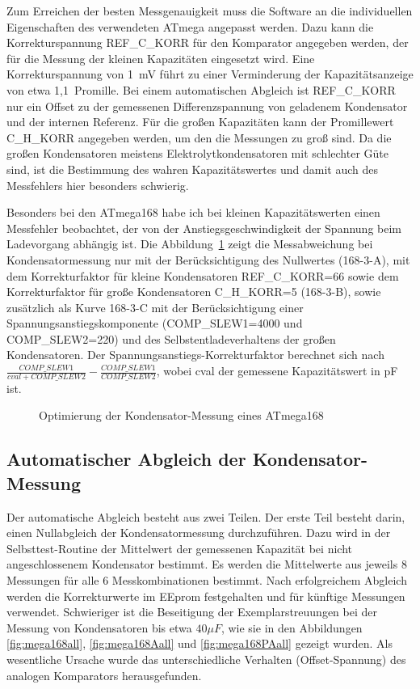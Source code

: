 Zum Erreichen der besten Messgenauigkeit muss die Software an die individuellen Eigenschaften des verwendeten ATmega
angepasst werden. Dazu kann die Korrekturspannung REF\_C\_KORR für den Komparator angegeben werden, der für die Messung der kleinen 
Kapazitäten eingesetzt wird. Eine Korrekturspannung von 1~mV führt zu einer Verminderung der Kapazitätsanzeige von etwa 1,1~Promille.
Bei einem automatischen Abgleich ist REF\_C\_KORR  nur ein Offset zu der gemessenen Differenzspannung von geladenem Kondensator
und der internen Referenz.
Für die großen Kapazitäten kann der Promillewert C\_H\_KORR angegeben werden, um den die Messungen
zu groß sind.
Da die großen Kondensatoren meistens Elektrolytkondensatoren mit schlechter Güte sind, ist die Bestimmung
des wahren Kapazitätswertes und damit auch des Messfehlers hier besonders schwierig.

Besonders bei den ATmega168 habe ich bei kleinen Kapazitätswerten einen Messfehler beobachtet, 
der von der Anstiegsgeschwindigkeit der Spannung beim Ladevorgang abhängig ist.
Die Abbildung~\ref{fig:mega168optcap} zeigt die Messabweichung bei Kondensatormessung nur mit der Berücksichtigung des
Nullwertes (168-3-A), mit dem Korrekturfaktor für kleine Kondensatoren REF\_C\_KORR=66 sowie dem Korrekturfaktor für große
Kondensatoren C\_H\_KORR=5 (168-3-B), sowie zusätzlich als Kurve 168-3-C  mit der Berücksichtigung einer Span\-nungs\-an\-stiegs\-kom\-po\-nen\-te 
(COMP\_SLEW1=4000 und COMP\_SLEW2=220) und des Selbst\-ent\-lade\-ver\-hal\-tens der großen Kon\-den\-sa\-toren.
Der Span\-nungs\-an\-stiegs-Kor\-rek\-tur\-faktor berechnet sich nach \(\frac{COMP\_SLEW1}{cval+COMP\_SLEW2} - \frac{COMP\_SLEW1}{COMP\_SLEW2}\),
wobei cval der gemessene Kapazitätswert in pF ist.

\begin{figure}[H]
\centering

\caption{Optimierung der Kondensator-Messung eines ATmega168}
\label{fig:mega168optcap}
\end{figure}

\subsection{Automatischer Abgleich der Kondensator-Messung}

Der automatische Abgleich besteht aus zwei Teilen. Der erste Teil besteht darin, einen Nullabgleich der Kondensatormessung durchzuführen.
Dazu wird in der Selbsttest-Routine der Mittelwert der gemessenen Kapazität bei nicht angeschlossenem Kondensator bestimmt.
Es werden die Mittelwerte aus jeweils 8 Messungen für alle 6 Messkombinationen bestimmt.
Nach erfolgreichem Abgleich werden die Korrekturwerte im EEprom festgehalten und für künftige Messungen verwendet.
Schwieriger ist die Beseitigung der Exemplarstreuungen bei der Messung von Kondensatoren bis etwa \(40 \mu F\), wie sie in den 
Abbildungen \ref{fig:mega168all}, \ref{fig:mega168Aall} und \ref{fig:mega168PAall} gezeigt wurden.
Als wesentliche Ursache wurde das unterschiedliche Verhalten (Offset-Spannung) des analogen Komparators herausgefunden.

